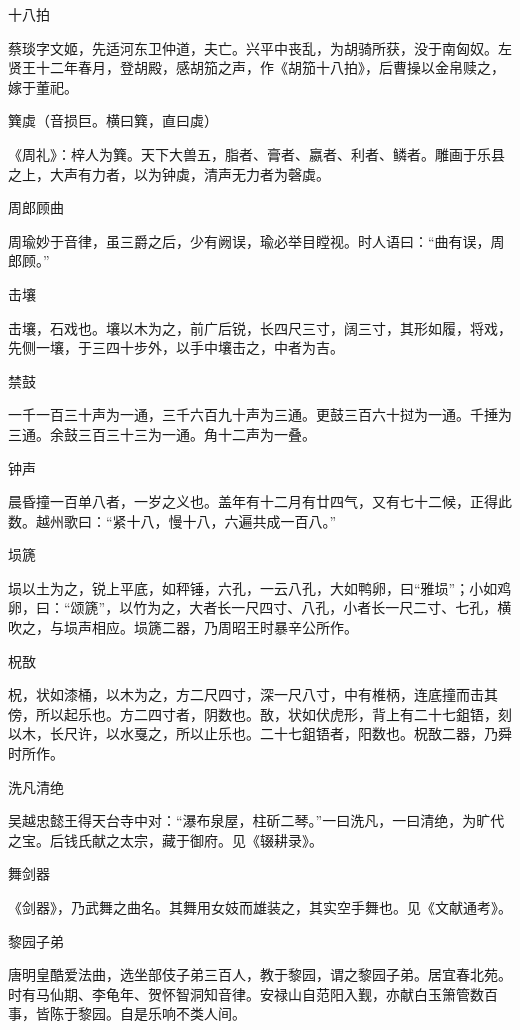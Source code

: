 \documentclass[a4paper,12pt,UTF8,twoside]{ctexbook}
\begin{document}
    十八拍
    
    蔡琰字文姬，先适河东卫仲道，夫亡。兴平中丧乱，为胡骑所获，没于南匈奴。左贤王十二年春月，登胡殿，感胡笳之声，作《胡笳十八拍》，后曹操以金帛赎之，嫁于董祀。
    
    簨虡（音损巨。横曰簨，直曰虡）
    
    《周礼》：梓人为簨。天下大兽五，脂者、膏者、嬴者、利者、鳞者。雕画于乐县之上，大声有力者，以为钟虡，清声无力者为磬虡。
    
    周郎顾曲
    
    周瑜妙于音律，虽三爵之后，少有阙误，瑜必举目瞠视。时人语曰：“曲有误，周郎顾。”
    
    击壤
    
    击壤，石戏也。壤以木为之，前广后锐，长四尺三寸，阔三寸，其形如履，将戏，先侧一壤，于三四十步外，以手中壤击之，中者为吉。
    
    禁鼓
    
    一千一百三十声为一通，三千六百九十声为三通。更鼓三百六十挝为一通。千捶为三通。余鼓三百三十三为一通。角十二声为一叠。
    
    钟声
    
    晨昏撞一百单八者，一岁之义也。盖年有十二月有廿四气，又有七十二候，正得此数。越州歌曰：“紧十八，慢十八，六遍共成一百八。”
    
    埙篪
    
    埙以土为之，锐上平底，如秤锤，六孔，一云八孔，大如鸭卵，曰“雅埙”；小如鸡卵，曰：“颂篪”，以竹为之，大者长一尺四寸、八孔，小者长一尺二寸、七孔，横吹之，与埙声相应。埙篪二器，乃周昭王时暴辛公所作。
    
    柷敔
    
    柷，状如漆桶，以木为之，方二尺四寸，深一尺八寸，中有椎柄，连底撞而击其傍，所以起乐也。方二四寸者，阴数也。敔，状如伏虎形，背上有二十七鉏铻，刻以木，长尺许，以水戛之，所以止乐也。二十七鉏铻者，阳数也。柷敔二器，乃舜时所作。
    
    洗凡清绝
    
    吴越忠懿王得天台寺中对：“瀑布泉屋，柱斫二琴。”一曰洗凡，一曰清绝，为旷代之宝。后钱氏献之太宗，藏于御府。见《辍耕录》。
    
    舞剑器
    
    《剑器》，乃武舞之曲名。其舞用女妓而雄装之，其实空手舞也。见《文献通考》。
    
    黎园子弟
    
    唐明皇酷爱法曲，选坐部伎子弟三百人，教于黎园，谓之黎园子弟。居宜春北苑。时有马仙期、李龟年、贺怀智洞知音律。安禄山自范阳入觐，亦献白玉箫管数百事，皆陈于黎园。自是乐响不类人间。
    
\end{document}
